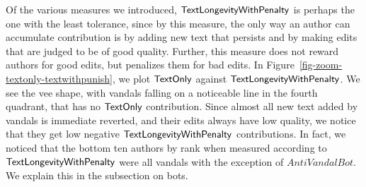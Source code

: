 Of the various measures we introduced, $\mathsf{TextLongevityWithPenalty}$ is perhaps the
one with the least tolerance, since by this measure, the only way
an author can accumulate contribution is by adding new
text that persists and by making edits that are judged to be
of good quality.
Further, this measure does not reward authors for good edits,
but penalizes them for bad edits.
In Figure~\ref{fig-zoom-textonly-textwithpunish}, we plot $\mathsf{TextOnly}$
against $\mathsf{TextLongevityWithPenalty}$.
We see the vee shape, with vandals falling on a noticeable line in
the fourth quadrant, that has no $\mathsf{TextOnly}$ contribution.
Since almost all new text added by vandals is immediate reverted,
and their edits always have low quality, we notice that they get
low negative $\mathsf{TextLongevityWithPenalty}$ contributions.
In fact, we noticed that the bottom ten authors by rank when
measured according to $\mathsf{TextLongevityWithPenalty}$ were all vandals with the exception
of $AntiVandalBot$.
We explain this in the subsection on bots.

